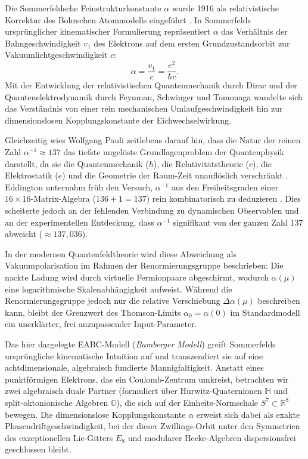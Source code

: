\documentclass[11pt,a4paper]{article}
\begin{document}
Die Sommerfeldsche Feinstrukturkonstante $\alpha$ wurde 1916 als relativistische Korrektur des Bohrschen Atommodells eingeführt \cite{Sommerfeld1916}. In Sommerfelds ursprünglicher kinematischer Formulierung repräsentiert $\alpha$ das Verhältnis der Bahngeschwindigkeit $v_1$ des Elektrons auf dem ersten Grundzustandsorbit zur Vakuumlichtgeschwindigkeit $c$:
\begin{equation}
\alpha = \frac{v_1}{c} = \frac{e^2}{\hbar c}.
\end{equation}
Mit der Entwicklung der relativistischen Quantenmechanik durch Dirac \cite{Dirac1928} und der Quantenelektrodynamik durch Feynman, Schwinger und Tomonaga wandelte sich das Verständnis von einer rein mechanischen Umlaufgeschwindigkeit hin zur dimensionslosen Kopplungskonstante der Eichwechselwirkung. 

Gleichzeitig wies Wolfgang Pauli zeitlebens darauf hin, dass die Natur der reinen Zahl $\alpha^{-1} \approx 137$ das tiefste ungelöste Grundlagenproblem der Quantenphysik darstellt, da sie die Quantenmechanik ($\hbar$), die Relativitätstheorie ($c$), die Elektrostatik ($e$) und die Geometrie der Raum-Zeit unauflöslich verschränkt \cite{Pauli1955}. Eddington unternahm früh den Versuch, $\alpha^{-1}$ aus den Freiheitsgraden einer $16 \times 16$-Matrix-Algebra ($136 + 1 = 137$) rein kombinatorisch zu deduzieren \cite{Eddington1936}. Dies scheiterte jedoch an der fehlenden Verbindung zu dynamischen Observablen und an der experimentellen Entdeckung, dass $\alpha^{-1}$ signifikant von der ganzen Zahl 137 abweicht ($\approx 137{,}036$).

In der modernen Quantenfeldtheorie wird diese Abweichung als Vakuumpolarisation im Rahmen der Renormierungsgruppe beschrieben: Die nackte Ladung wird durch virtuelle Fermionpaare abgeschirmt, wodurch $\alpha(\mu)$ eine logarithmische Skalenabhängigkeit aufweist. 
Während die Renormierungsgruppe jedoch nur die relative Verschiebung $\Delta \alpha(\mu)$ beschreiben kann, bleibt der Grenzwert des Thomson-Limits $\alpha_0 = \alpha(0)$ im Standardmodell ein unerklärter, frei anzupassender Input-Parameter.

Das hier dargelegte EABC-Modell (\emph{Bamberger Modell}) greift Sommerfelds ursprüngliche kinematische Intuition auf und transzendiert sie auf eine achtdimensionale, algebraisch fundierte Mannigfaltigkeit. Anstatt eines punktförmigen Elektrons, das ein Coulomb-Zentrum umkreist, betrachten wir zwei algebraisch duale Partner (formuliert über Hurwitz-Quaternionen $\mathbb{H}$ und split-oktonionische Algebren $\mathbb{O}$), die sich auf der Einheits-Normschale $S^7 \subset \mathbb{R}^8$ bewegen. Die dimensionslose Kopplungskonstante $\alpha$ erweist sich dabei als exakte Phasendriftgeschwindigkeit, bei der dieser Zwillings-Orbit unter den Symmetrien des exzeptionellen Lie-Gitters $E_8$ und modularer Hecke-Algebren dispersionsfrei geschlossen bleibt.
\end{document}
